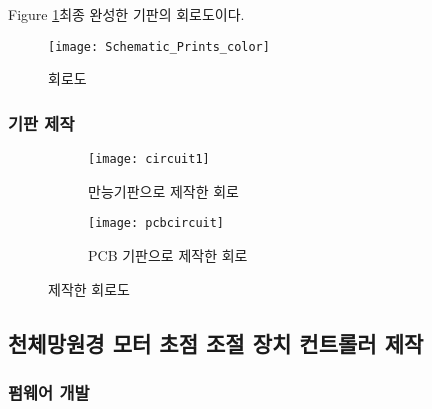 Figure \ref{fig:Schematic_Prints}\는 최종 완성한 기판의 회로도이다.
\begin{figure}
	\begin{center}
	\texttt{[image: Schematic\_Prints\_color]}
	\caption{회로도}
	\label{fig:Schematic_Prints}
	\end{center}
\end{figure}


\subsubsection{기판 제작}

\begin{figure}[h]
	\begin{subfigure}{0.5\textwidth}
		\texttt{[image: circuit1]} 
		\caption{만능기판으로 제작한 회로}
		\label{fig:circuit1}
	\end{subfigure}
	\begin{subfigure}{0.5\textwidth}
		\texttt{[image: pcbcircuit]}
		\caption{PCB 기판으로 제작한 회로}
		\label{fig:pcbcircuit}
	\end{subfigure}
	\caption{제작한 회로도}
	\label{fig:image2}
\end{figure}



\subsection{천체망원경 모터 초점 조절 장치 컨트롤러 제작}

\subsubsection{펌웨어 개발}

